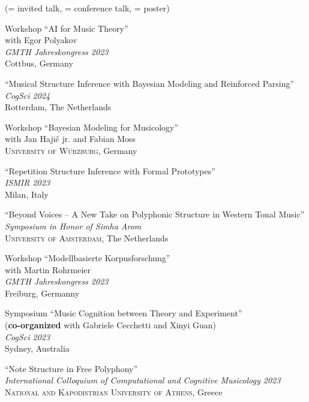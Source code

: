 \documentclass[10pt]{scrartcl}
\newcommand{\margintext}[1]{\marginpar{\raggedleft\small#1}}
\newcommand{\entry}[1]{\vphantom{x}\margintext{#1}}
\begin{document}
(\invited = invited talk, \contrib = conference talk, \poster = poster)

\entry{2024}%
\contrib Workshop \enquote{AI for Music Theory}
\\
with Egor Polyakov\\
\textit{GMTH Jahreskongress 2023}\\
Cottbus, Germany

\poster \enquote{Musical Structure Inference with Bayesian Modeling and Reinforced Parsing}\\
\textit{CogSci 2024}\\
Rotterdam, The Netherlands

\invited Workshop \enquote{Bayesian Modeling for Musicology}
\\
with Jan Hajič jr. and Fabian Moss\\
\textsc{University of Würzburg}, Germany

\entry{2023}%
\contrib \poster \enquote{Repetition Structure Inference with Formal Prototypes}
\\
\textit{ISMIR 2023}\\
Milan, Italy

\invited \enquote{Beyond Voices -- A New Take on Polyphonic Structure in Western Tonal Music}
\\
\textit{Symposium in Honor of Simha Arom}\\
\textsc{University of Amsterdam}, The Netherlands

\contrib Workshop \enquote{Modellbasierte Korpusforschung}
\\
with Martin Rohrmeier\\
\textit{GMTH Jahreskongress 2023}\\
Freiburg, Germanny

\contrib Symposium \enquote{Music Cognition between Theory and Experiment}
\\
(\textbf{co-organized} with Gabriele Cecchetti and Xinyi Guan)\\
\textit{CogSci 2023}\\
Sydney, Australia

\poster \enquote{Note Structure in Free Polyphony}
\\
\textit{International Colloquium of Computational and Cognitive Musicology 2023}\\
\textsc{National and Kapodistrian University of Athens}, Greece
\end{document}
